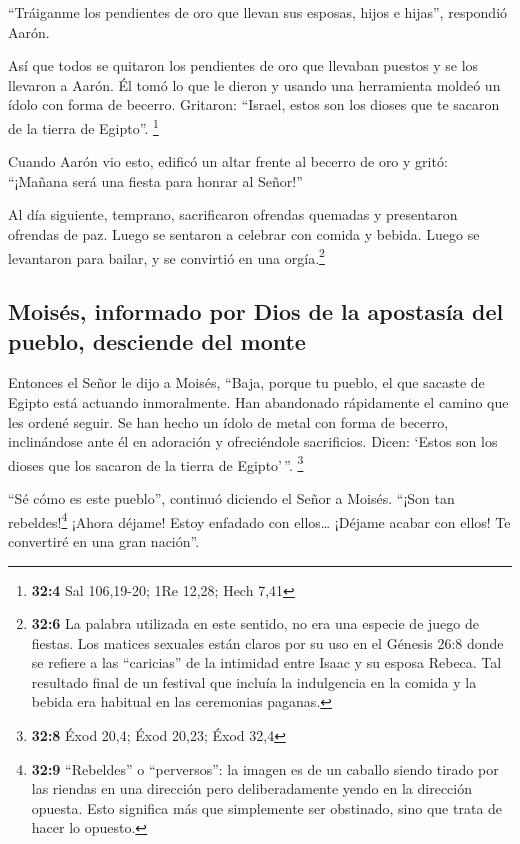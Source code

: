  ``Tráiganme los pendientes de oro que llevan sus esposas,
hijos e hijas'', respondió Aarón.

 Así que todos se quitaron los pendientes de oro que
llevaban puestos y se los llevaron a Aarón.  Él tomó lo
que le dieron y usando una herramienta moldeó un ídolo con forma de
becerro. Gritaron: ``Israel, estos son los dioses que te sacaron de la
tierra de Egipto''. \footnote{\textbf{32:4} Sal 106,19-20; 1Re 12,28;
  Hech 7,41}

 Cuando Aarón vio esto, edificó un altar frente al becerro
de oro y gritó: ``¡Mañana será una fiesta para honrar al Señor!''

 Al día siguiente, temprano, sacrificaron ofrendas
quemadas y presentaron ofrendas de paz. Luego se sentaron a celebrar con
comida y bebida. Luego se levantaron para bailar, y se convirtió en una
orgía.\footnote{\textbf{32:6} La palabra utilizada en este sentido, no
  era una especie de juego de fiestas. Los matices sexuales están claros
  por su uso en el Génesis 26:8 donde se refiere a las ``caricias'' de
  la intimidad entre Isaac y su esposa Rebeca. Tal resultado final de un
  festival que incluía la indulgencia en la comida y la bebida era
  habitual en las ceremonias paganas.}

\hypertarget{moisuxe9s-informado-por-dios-de-la-apostasuxeda-del-pueblo-desciende-del-monte}{%
\subsection{Moisés, informado por Dios de la apostasía del pueblo,
desciende del
monte}\label{moisuxe9s-informado-por-dios-de-la-apostasuxeda-del-pueblo-desciende-del-monte}}

 Entonces el Señor le dijo a Moisés, ``Baja, porque tu
pueblo, el que sacaste de Egipto está actuando inmoralmente.
 Han abandonado rápidamente el camino que les ordené
seguir. Se han hecho un ídolo de metal con forma de becerro,
inclinándose ante él en adoración y ofreciéndole sacrificios. Dicen:
`Estos son los dioses que los sacaron de la tierra de Egipto'\,''.
\footnote{\textbf{32:8} Éxod 20,4; Éxod 20,23; Éxod 32,4}

 ``Sé cómo es este pueblo'', continuó diciendo el Señor a
Moisés. ``¡Son tan rebeldes!\footnote{\textbf{32:9} ``Rebeldes'' o
  ``perversos'': la imagen es de un caballo siendo tirado por las
  riendas en una dirección pero deliberadamente yendo en la dirección
  opuesta. Esto significa más que simplemente ser obstinado, sino que
  trata de hacer lo opuesto.}  ¡Ahora déjame! Estoy
enfadado con ellos\ldots{} ¡Déjame acabar con ellos! Te convertiré en
una gran nación''.

